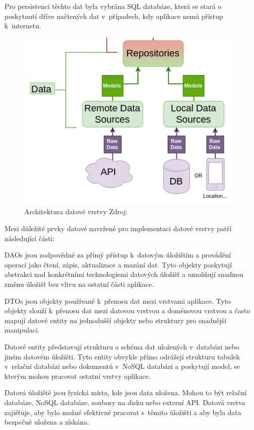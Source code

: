 Pro persistenci těchto dat byla vybrána SQL databáze, která se stará o poskytnutí dříve načtených dat v~případech, kdy aplikace nemá přístup k~internetu.


\begin{figure}[H]
  \centering
  \includegraphics[width=.5\textwidth]{data_layer_diagram.png}
  \caption{Architektura datové vrstvy Zdroj: \cite{imgDataFlow}}
  \label{fig:arch_data_layer}
\end{figure}


Mezi důležité prvky datové navržené pro implementaci datové vrstvy patří následující části:

DAOs jsou zodpovědné za přímý přístup k~datovým úložištím a provádění operací jako čtení, zápis, aktualizace a mazání dat. Tyto objekty 
poskytují abstrakci nad konkrétními technologiemi datových úložišť a umožňují snadnou změnu úložišť bez vlivu na ostatní části aplikace.

DTOs jsou objekty používané k~přenosu dat mezi vrstvami aplikace. Tyto objekty slouží k~přenosu dat mezi datovou vrstvou a doménovou 
vrstvou a často mapují datové entity na jednodušší objekty nebo struktury pro snadnější manipulaci.

Datové entity představují strukturu a schéma dat uložených v~databázi nebo jiném datovém úložišti. Tyto entity obvykle přímo odrážejí
strukturu tabulek v~relační databázi nebo dokumentů v~NoSQL databázi a poskytují model, se kterým mohou pracovat ostatní vrstvy aplikace.

Datová úložiště jsou fyzická místa, kde jsou data uložena. Mohou to být relační databáze, NoSQL databáze, soubory na disku nebo externí API. 
Datová vrstva zajišťuje, aby bylo možné efektivně pracovat s~těmito úložišti a aby byla data bezpečně uložena a získána.

